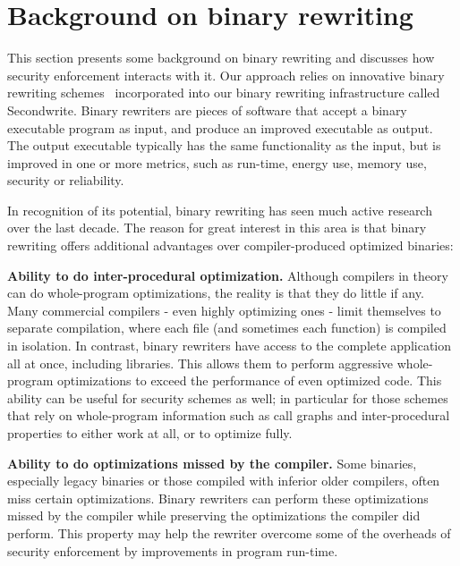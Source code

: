 \section{Background on binary rewriting}
\label{sec:background}

This section presents some background on binary rewriting and
discusses how security enforcement interacts with it. Our approach
relies on innovative binary rewriting
schemes~\cite{blind-kapil,blind-matt} incorporated into our binary
rewriting infrastructure called Secondwrite. Binary rewriters are
pieces of software that accept a binary executable program as input,
and produce an improved executable as output. The output executable
typically has the same functionality as the input, but is improved in
one or more metrics, such as run-time, energy use, memory use,
security or reliability.

 In recognition of its
potential, binary rewriting has seen much active research over the
last decade. The reason for great interest in this area is that binary
rewriting offers additional advantages over compiler-produced
optimized binaries:

\mybeginlist

\item \textbf{Ability to do inter-procedural optimization.} Although
  compilers in theory can do whole-program optimizations, the reality
  is that they do little if any. Many commercial compilers - even
  highly optimizing ones - limit themselves to separate compilation,
  where each file (and sometimes each function) is compiled in
  isolation. In contrast, binary rewriters have access to the complete
  application all at once, including libraries. This allows them to
  perform aggressive whole-program optimizations to exceed the
  performance of even optimized code. This ability can be useful for security schemes as well; in
    particular for those schemes that rely on whole-program information
    such as call graphs and inter-procedural properties to either work
    at all, or to optimize fully.

\item \textbf{Ability to do optimizations missed by the compiler.}
  Some binaries, especially legacy binaries or those compiled with
  inferior older compilers, often miss certain optimizations. Binary
  rewriters can perform these optimizations missed by the compiler
  while preserving the optimizations the compiler did 
  perform. This property may help the rewriter overcome some of the overheads
    of security enforcement by improvements in program run-time.

